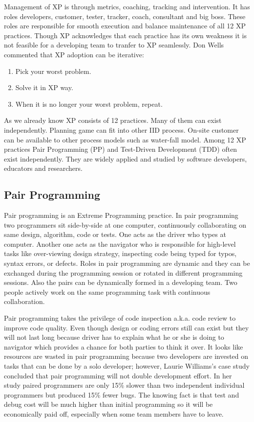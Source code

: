 Management of XP is through metrics, coaching, tracking and intervention.
It has roles developers, customer, tester, tracker, coach, consultant and
big boss. These roles are responsible for smooth execution and balance
maintenance of all 12 XP practices. Though XP acknowledges that each
practice has its own weakness it is not feasible for a developing team to
tranfer to XP seamlessly. Don Wells \cite{Beck:00} commented that XP
adoption can be iterative:
\begin{enumerate}
\item Pick your worst problem.
\item Solve it in XP way.
\item When it is no longer your worst problem, repeat.
\end{enumerate}

As we already know XP consists of 12 practices. Many of them can exist
independently. Planning game can fit into other IID process. On-site
customer can be available to other process models such as water-fall model.
Among 12 XP practices Pair Programming (PP) and Test-Driven Development
(TDD) often exist independently. They are widely applied and studied by
software developers, educators and researchers.

\subsection{Pair Programming}
Pair programming is an Extreme Programming practice. In pair programming
two programmers sit side-by-side at one computer, continuously
collaborating on same design, algorithm, code or tests. One acts as the
driver who types at computer. Another one acts as the navigator who is
responsible for high-level tasks like over-viewing design strategy,
inspecting code being typed for typos, syntax errors, or defects. Roles in
pair programming are dynamic and they can be exchanged during the
programming session or rotated in different programming sessions. Also the
pairs can be dynamically formed in a developing team. Two people actively
work on the same programming task with continuous collaboration.

Pair programming takes the privilege of code inspection a.k.a. code review
to improve code quality. Even though design or coding errors still can
exist but they will not last long because driver has to explain what he or
she is doing to navigator which provides a chance for both parties to think
it over. It looks like resources are wasted in pair programming because two
developers are invested on tasks that can be done by a solo developer;
however, Laurie Williams's case study concluded that pair programming will
not double development effort. In her study paired programmers are only
15\% slower than two independent individual programmers but produced 15\%
fewer bugs.  The knowing fact is that test and debug cost will be much
higher than initial programming so it will be economically paid off,
especially when some team members have to leave.

